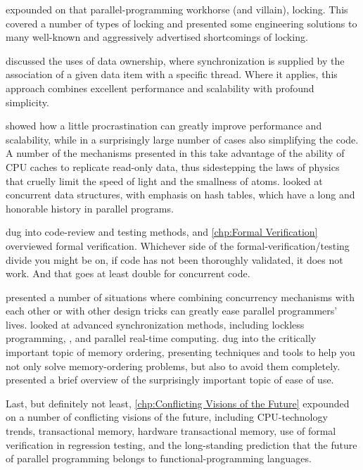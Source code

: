  expounded on that parallel-programming workhorse
(and villain), locking.
This  covered a number of types of locking
and presented some engineering solutions to many well-known and
aggressively advertised shortcomings of locking.

 discussed the uses of data ownership, where
synchronization is supplied by the association of a given data item
with a specific thread.
Where it applies, this approach combines excellent performance and
scalability with profound simplicity.

 showed how a little procrastination can
greatly improve performance and scalability, while in a surprisingly large
number of cases also simplifying the code.
A number of the mechanisms presented in this
take advantage of the ability of CPU caches to replicate read-only data,
thus sidestepping the laws of physics that cruelly limit the speed of
light and the smallness of atoms.
 looked at concurrent data structures, with
emphasis on hash tables, which have a long and honorable history in
parallel programs.

 dug into code-review and testing methods, and
\cref{chp:Formal Verification} overviewed formal verification.
Whichever side of the formal-verification/\-testing divide you might
be on, if code has not been thoroughly validated, it does not work.
And that goes at least double for concurrent code.

 presented a number of situations
where combining concurrency mechanisms with each other or with other
design tricks can greatly ease parallel programmers' lives.
 looked at advanced
synchronization methods, including lockless programming, ,
and parallel real-time computing.
 dug into the
critically important topic of memory ordering, presenting techniques
and tools to help you not only solve memory-ordering problems, but
also to avoid them completely.
 presented a brief overview of the surprisingly
important topic of ease of use.

Last, but definitely not least, \cref{chp:Conflicting Visions of the Future}
expounded on a number of conflicting visions of the future, including
CPU-technology trends, transactional memory, hardware transactional
memory, use of formal verification in regression testing, and the
long-standing prediction that the future of parallel programming belongs
to functional-programming languages.


